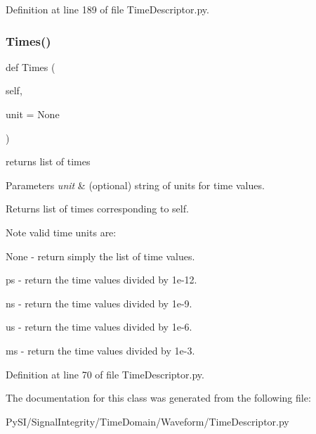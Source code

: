 Definition at line 189 of file Time\+Descriptor.\+py.

\mbox{\label{classSignalIntegrity_1_1TimeDomain_1_1Waveform_1_1TimeDescriptor_1_1TimeDescriptor_a5ba53f81d111ea013ebb7f55ed99d959}} 
\subsubsection{\texorpdfstring{Times()}{Times()}}
{\footnotesize\ttfamily def Times (\begin{DoxyParamCaption}\item[{}]{self,  }\item[{}]{unit = {\ttfamily None} }\end{DoxyParamCaption})}



returns list of times 


\begin{DoxyParams}{Parameters}
{\em unit} & (optional) string of units for time values. \\
\hline
\end{DoxyParams}
\begin{DoxyReturn}{Returns}
list of times corresponding to self. 
\end{DoxyReturn}
\begin{DoxyNote}{Note}
valid time units are\+:
\begin{DoxyItemize}
\item None -\/ return simply the list of time values.
\item \textquotesingle{}ps\textquotesingle{} -\/ return the time values divided by 1e-\/12.
\item \textquotesingle{}ns\textquotesingle{} -\/ return the time values divided by 1e-\/9.
\item \textquotesingle{}us\textquotesingle{} -\/ return the time values divided by 1e-\/6.
\item \textquotesingle{}ms\textquotesingle{} -\/ return the time values divided by 1e-\/3. 
\end{DoxyItemize}
\end{DoxyNote}


Definition at line 70 of file Time\+Descriptor.\+py.



The documentation for this class was generated from the following file\+:\begin{DoxyCompactItemize}
\item 
Py\+S\+I/\+Signal\+Integrity/\+Time\+Domain/\+Waveform/Time\+Descriptor.\+py\end{DoxyCompactItemize}
